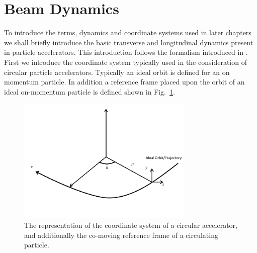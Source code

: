 \section{Beam Dynamics}
\label{sec:BeamDyn}

To introduce the terms, dynamics and coordinate systems used in later chapters we shall briefly introduce the basic transverse and longitudinal dynamics present in particle accelerators. This introduction follows the formalism introduced in \cite{Holzer:TransDyn}. First we introduce the coordinate system typically used in the consideration of circular particle accelerators. Typically an ideal orbit is defined for an on momentum particle. In addition a reference frame placed upon the orbit of an ideal on-momentum particle is defined shown in Fig.~\ref{fig:accel-coord-system}. 

\begin{figure}
\begin{center}
\includegraphics[width=0.75\textwidth]{Introduction/figures/coordinate-system.pdf}
\end{center}
\caption{The representation of the coordinate system of a circular accelerator, and additionally the co-moving reference frame of a circulating particle.}
\label{fig:accel-coord-system}
\end{figure}

